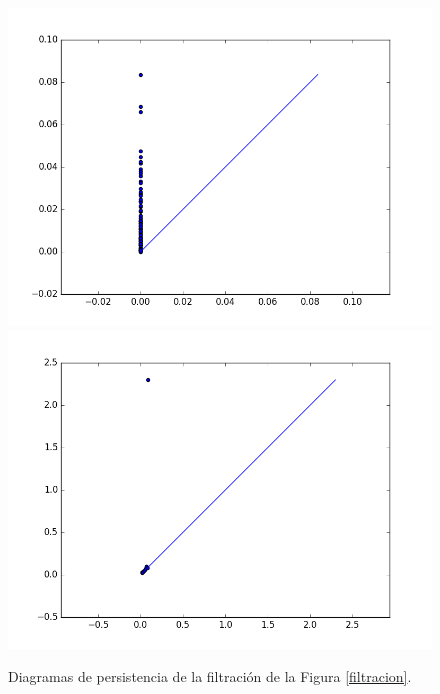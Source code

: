 \documentclass[12pt,a4paper,twoside]{article} %
\theoremstyle{plain}
\theoremstyle{definition}
\begin{document}
\begin{figure}[h!]
\centering
\includegraphics[scale=0.33]{img/persistence0.png}
\includegraphics[scale=0.33]{img/persistencediagram.png}
\caption{Diagramas de persistencia de la filtración de la Figura \ref{filtracion}.}
\label{diagramas}
\end{figure}
\end{document}
